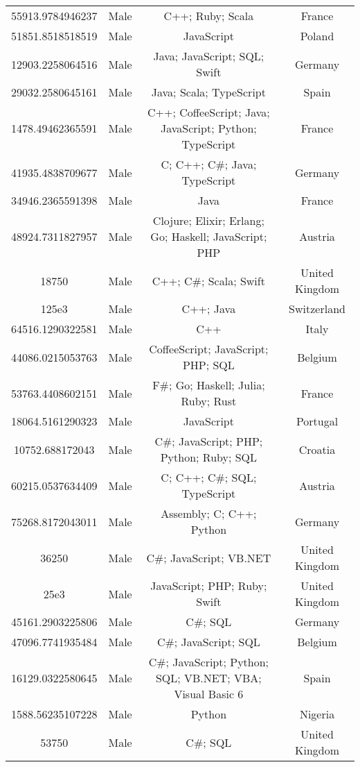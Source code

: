 \begin{center}
\begin{tabular}{ |c|c|c|c| }
55913.9784946237  &  Male  &  C++; Ruby; Scala  &  France  \\ 
51851.8518518519  &  Male  &  JavaScript  &  Poland  \\ 
12903.2258064516  &  Male  &  Java; JavaScript; SQL; Swift  &  Germany  \\ 
29032.2580645161  &  Male  &  Java; Scala; TypeScript  &  Spain  \\ 
1478.49462365591  &  Male  &  C++; CoffeeScript; Java; JavaScript; Python; TypeScript  &  France  \\ 
41935.4838709677  &  Male  &  C; C++; C\#; Java; TypeScript  &  Germany  \\ 
34946.2365591398  &  Male  &  Java  &  France  \\ 
48924.7311827957  &  Male  &  Clojure; Elixir; Erlang; Go; Haskell; JavaScript; PHP  &  Austria  \\ 
18750  &  Male  &  C++; C\#; Scala; Swift  &  United Kingdom  \\ 
125e3  &  Male  &  C++; Java  &  Switzerland  \\ 
64516.1290322581  &  Male  &  C++  &  Italy  \\ 
44086.0215053763  &  Male  &  CoffeeScript; JavaScript; PHP; SQL  &  Belgium  \\ 
53763.4408602151  &  Male  &  F\#; Go; Haskell; Julia; Ruby; Rust  &  France  \\ 
18064.5161290323  &  Male  &  JavaScript  &  Portugal  \\ 
10752.688172043  &  Male  &  C\#; JavaScript; PHP; Python; Ruby; SQL  &  Croatia  \\ 
60215.0537634409  &  Male  &  C; C++; C\#; SQL; TypeScript  &  Austria  \\ 
75268.8172043011  &  Male  &  Assembly; C; C++; Python  &  Germany  \\ 
36250  &  Male  &  C\#; JavaScript; VB.NET  &  United Kingdom  \\ 
25e3  &  Male  &  JavaScript; PHP; Ruby; Swift  &  United Kingdom  \\ 
45161.2903225806  &  Male  &  C\#; SQL  &  Germany  \\ 
47096.7741935484  &  Male  &  C\#; JavaScript; SQL  &  Belgium  \\ 
16129.0322580645  &  Male  &  C\#; JavaScript; Python; SQL; VB.NET; VBA; Visual Basic 6  &  Spain  \\ 
1588.56235107228  &  Male  &  Python  &  Nigeria  \\ 
53750  &  Male  &  C\#; SQL  &  United Kingdom  \\ 

\end{tabular}
\end{center}
